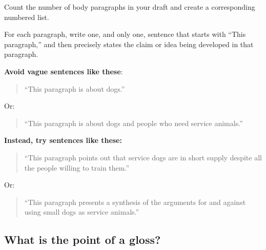 \documentclass[12pt, hidelinks]{article} %
\begin{document}
Count the number of body paragraphs in your draft and create a corresponding numbered list.

For each paragraph, write one, and only one, sentence that starts with ``This paragraph,'' and then  precisely states the claim or idea being developed in that paragraph.
        	
\textbf{Avoid vague sentences like these}:

\begin{quote} ``This paragraph is about dogs.'' \end{quote}

Or:

\begin{quote} ``This paragraph is about dogs and people who need service animals.'' \end{quote}
        	
\textbf{Instead, try sentences like these:}
                    	     	
\begin{quote} ``This paragraph points out that service dogs are in short supply despite all the people willing to train them.''\end{quote}
 
 Or:
                                	
\begin{quote} ``This paragraph presents a synthesis of the arguments for and against using  small dogs as service animals.'' \end{quote}
                 
  	        
\subsection{What is the point of a gloss?}
\end{document}
